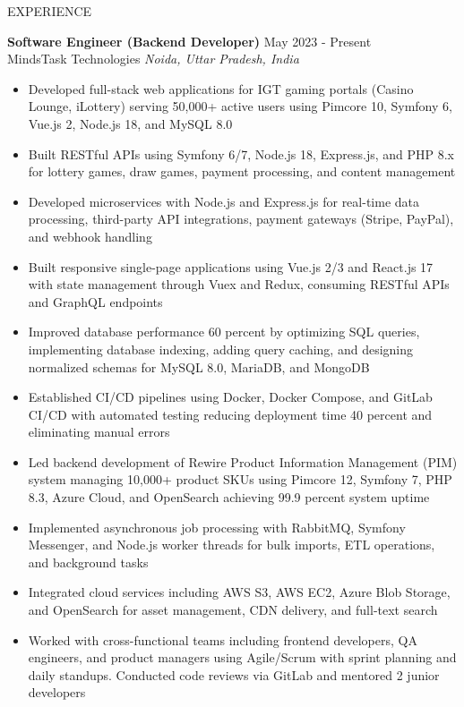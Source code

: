 \documentclass{resume} %
\begin{document}
\begin{rSection}{EXPERIENCE}

\textbf{Software Engineer (Backend Developer)} \hfill May 2023 - Present\\
MindsTask Technologies \hfill \textit{Noida, Uttar Pradesh, India}
 \begin{itemize}
    \itemsep -3pt {}
     \item Developed full-stack web applications for IGT gaming portals (Casino Lounge, iLottery) serving 50,000+ active users using Pimcore 10, Symfony 6, Vue.js 2, Node.js 18, and MySQL 8.0
     \item Built RESTful APIs using Symfony 6/7, Node.js 18, Express.js, and PHP 8.x for lottery games, draw games, payment processing, and content management
     \item Developed microservices with Node.js and Express.js for real-time data processing, third-party API integrations, payment gateways (Stripe, PayPal), and webhook handling
     \item Built responsive single-page applications using Vue.js 2/3 and React.js 17 with state management through Vuex and Redux, consuming RESTful APIs and GraphQL endpoints
     \item Improved database performance 60 percent by optimizing SQL queries, implementing database indexing, adding query caching, and designing normalized schemas for MySQL 8.0, MariaDB, and MongoDB
     \item Established CI/CD pipelines using Docker, Docker Compose, and GitLab CI/CD with automated testing reducing deployment time 40 percent and eliminating manual errors
     \item Led backend development of Rewire Product Information Management (PIM) system managing 10,000+ product SKUs using Pimcore 12, Symfony 7, PHP 8.3, Azure Cloud, and OpenSearch achieving 99.9 percent system uptime
     \item Implemented asynchronous job processing with RabbitMQ, Symfony Messenger, and Node.js worker threads for bulk imports, ETL operations, and background tasks
     \item Integrated cloud services including AWS S3, AWS EC2, Azure Blob Storage, and OpenSearch for asset management, CDN delivery, and full-text search
     \item Worked with cross-functional teams including frontend developers, QA engineers, and product managers using Agile/Scrum with sprint planning and daily standups. Conducted code reviews via GitLab and mentored 2 junior developers
 \end{itemize}

\end{rSection}
\end{document}
